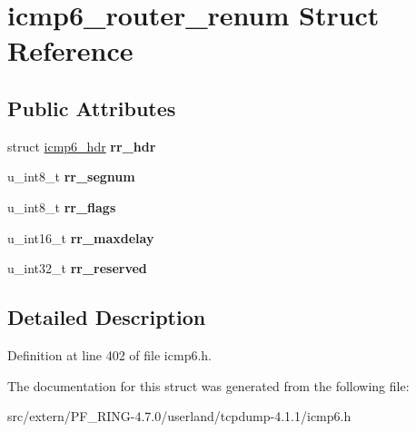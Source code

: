 \hypertarget{structicmp6__router__renum}{
\section{icmp6\_\-router\_\-renum Struct Reference}
\label{structicmp6__router__renum}
}
\subsection*{Public Attributes}
\begin{DoxyCompactItemize}
\item 
\hypertarget{structicmp6__router__renum_af6a68173fecc54b9377eeff408162017}{
struct \hyperlink{structicmp6__hdr}{icmp6\_\-hdr} {\bfseries rr\_\-hdr}}
\label{structicmp6__router__renum_af6a68173fecc54b9377eeff408162017}

\item 
\hypertarget{structicmp6__router__renum_a659950a3c8cdbcfd8671c1eb576634fd}{
u\_\-int8\_\-t {\bfseries rr\_\-segnum}}
\label{structicmp6__router__renum_a659950a3c8cdbcfd8671c1eb576634fd}

\item 
\hypertarget{structicmp6__router__renum_a923370d0ebe864756a9266927afd6862}{
u\_\-int8\_\-t {\bfseries rr\_\-flags}}
\label{structicmp6__router__renum_a923370d0ebe864756a9266927afd6862}

\item 
\hypertarget{structicmp6__router__renum_a44c7d857271b81d54e56cd485fc8184b}{
u\_\-int16\_\-t {\bfseries rr\_\-maxdelay}}
\label{structicmp6__router__renum_a44c7d857271b81d54e56cd485fc8184b}

\item 
\hypertarget{structicmp6__router__renum_a7389108d0e251a54f27a147fbc6c4fe7}{
u\_\-int32\_\-t {\bfseries rr\_\-reserved}}
\label{structicmp6__router__renum_a7389108d0e251a54f27a147fbc6c4fe7}

\end{DoxyCompactItemize}


\subsection{Detailed Description}


Definition at line 402 of file icmp6.h.



The documentation for this struct was generated from the following file:\begin{DoxyCompactItemize}
\item 
src/extern/PF\_\-RING-\/4.7.0/userland/tcpdump-\/4.1.1/icmp6.h\end{DoxyCompactItemize}
